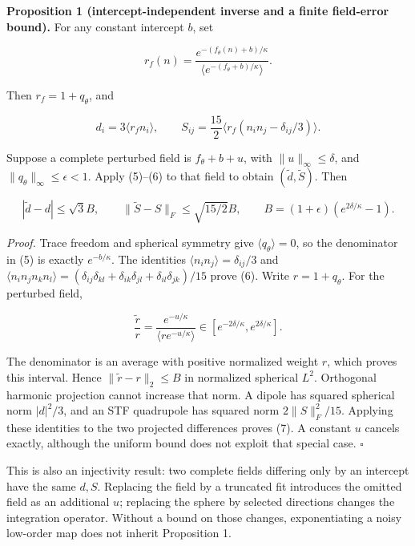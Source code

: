 \documentclass[aps,prd,reprint,onecolumn,11pt,nofootinbib,notitlepage]{revtex4-2}
\begin{document}
\textbf{Proposition 1 (intercept-independent inverse and a finite field-error bound).} For any constant intercept \(b\), set

\begin{equation}
 r_f(n)=\frac{e^{-(f_\theta(n)+b)/\kappa}}
                    {\langle e^{-(f_\theta+b)/\kappa}\rangle} .\tag{5}
\end{equation}

Then \(r_f=1+q_\theta\), and

\begin{equation}
 d_i=3\langle r_fn_i\rangle,\qquad
 S_{ij}=\frac{15}{2}\langle r_f(n_in_j-\delta_{ij}/3)\rangle .\tag{6}
\end{equation}

Suppose a complete perturbed field is \(f_\theta+b+u\), with \(\|u\|_\infty\le\delta\), and \(\|q_\theta\|_\infty\le\epsilon<1\). Apply (5)--(6) to that field to obtain \((\widetilde d,\widetilde S)\). Then

\begin{equation}
 |\widetilde d-d|\le\sqrt3 B,\qquad
 \|\widetilde S-S\|_F\le\sqrt{15/2}B,\qquad
 B=(1+\epsilon)(e^{2\delta/\kappa}-1).\tag{7}
\end{equation}

\textit{Proof.} Trace freedom and spherical symmetry give \(\langle q_\theta\rangle=0\), so the denominator in (5) is exactly \(e^{-b/\kappa}\). The identities \(\langle n_in_j\rangle=\delta_{ij}/3\) and \(\langle n_in_jn_kn_l\rangle=(\delta_{ij}\delta_{kl}+\delta_{ik}\delta_{jl}+\delta_{il}\delta_{jk})/15\) prove (6). Write \(r=1+q_\theta\). For the perturbed field,

\begin{equation}
 \frac{\widetilde r}{r}=
 \frac{e^{-u/\kappa}}{\langle r e^{-u/\kappa}\rangle}
 \in[e^{-2\delta/\kappa},e^{2\delta/\kappa}].\tag{8}
\end{equation}

The denominator is an average with positive normalized weight \(r\), which proves this interval. Hence \(\|\widetilde r-r\|_2\le B\) in normalized spherical \(L^2\). Orthogonal harmonic projection cannot increase that norm. A dipole has squared spherical norm \(|d|^2/3\), and an STF quadrupole has squared norm \(2\|S\|_F^2/15\). Applying these identities to the two projected differences proves (7). A constant \(u\) cancels exactly, although the uniform bound does not exploit that special case. \(\square\)

This is also an injectivity result: two complete fields differing only by an intercept have the same \(d,S\). Replacing the field by a truncated fit introduces the omitted field as an additional \(u\); replacing the sphere by selected directions changes the integration operator. Without a bound on those changes, exponentiating a noisy low-order map does not inherit Proposition 1.
\end{document}
